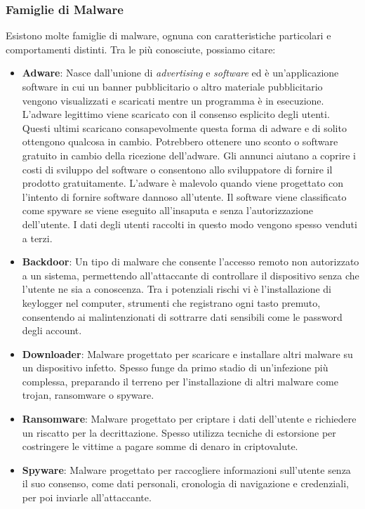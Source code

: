 \subsubsection{Famiglie di Malware}
Esistono molte famiglie di malware, ognuna con caratteristiche particolari e comportamenti distinti. Tra le più conosciute, possiamo citare:
\begin{itemize}
    \item \textbf{Adware}: Nasce dall'unione di \emph{advertising} e \emph{software} ed è un'applicazione software in cui un banner pubblicitario o altro materiale pubblicitario vengono visualizzati e scaricati mentre un programma è in esecuzione.
    L'adware legittimo viene scaricato con il consenso esplicito degli utenti. Questi ultimi scaricano consapevolmente questa forma di adware e di solito ottengono qualcosa in cambio. Potrebbero ottenere uno sconto o software gratuito in cambio della ricezione dell'adware. Gli annunci aiutano a coprire i costi di sviluppo del software o consentono allo sviluppatore di fornire il prodotto gratuitamente.
    L'adware è malevolo quando viene progettato con l'intento di fornire software dannoso all'utente. Il software viene classificato come spyware se viene eseguito all'insaputa e senza l'autorizzazione dell'utente. I dati degli utenti raccolti in questo modo vengono spesso venduti a terzi.
    \item \textbf{Backdoor}: Un tipo di malware che consente l'accesso remoto non autorizzato a un sistema, permettendo all'attaccante di controllare il dispositivo senza che l'utente ne sia a conoscenza. Tra i potenziali rischi vi è l'installazione di keylogger nel computer, strumenti che registrano ogni tasto premuto, consentendo ai malintenzionati di sottrarre dati sensibili come le password degli account.
    \item \textbf{Downloader}: Malware progettato per scaricare e installare altri malware su un dispositivo infetto. Spesso funge da primo stadio di un'infezione più complessa, preparando il terreno per l'installazione di altri malware come trojan, ransomware o spyware.
    \item \textbf{Ransomware}: Malware progettato per criptare i dati dell'utente e richiedere un riscatto per la decrittazione. Spesso utilizza tecniche di estorsione per costringere le vittime a pagare somme di denaro in criptovalute.
    \item \textbf{Spyware}: Malware progettato per raccogliere informazioni sull'utente senza il suo consenso, come dati personali, cronologia di navigazione e credenziali, per poi inviarle all'attaccante.

\end{itemize}
